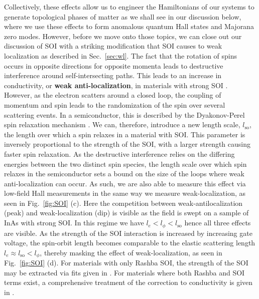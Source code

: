 Collectively, these effects allow us to engineer the Hamiltonians of our systems to generate topological phases of matter as we shall see in our discussion below,
where we use these effects to form anomalous quantum Hall states and Majorana zero modes. However, before we move onto those topics, we can close out our discussion of SOI
with a striking modification that SOI causes to weak localization as described in Sec.~\ref{sec:wl}. The fact that the rotation of spins occurs in opposite
directions for opposite momenta leads to destructive interference around self-intersecting paths. This leads to an increase in conductivity, or \textbf{weak anti-localization},
in materials with strong SOI \cite{10.1143/PTP.63.707}. However, as the electron scatters around a closed loop, the coupling of momentum and spin leads to the randomization of
the spin over several scattering events. In a semiconductor, this is described by the Dyakonov-Perel spin relaxation
mechanism \cite{DYAKONOV1971459}. We can, therefore, introduce a new length scale, $l_\textrm{so}$, the length over which a spin relaxes in a material with SOI.
This parameter is inversely proportional to the strength of the SOI, with a larger strength causing faster spin relaxation.
As the destructive interference relies on the differing energies between the two distinct spin species, the length scale over which spin relaxes in the semiconductor sets
a bound on the size of the loops where weak anti-localization can occur. As such, we are also able to measure
this effect via low-field Hall measurements in the same way we measure weak-localization, as seen in Fig.~\ref{fig:SOI} (c). Here the competition between
weak-antilocalization (peak) and weak-localization (dip) is visible as the field is swept on a sample of InAs with strong SOI. In this regime we have $l_e < l_\phi < l_\textrm{so}$
hence all three effects are visible. As the strength of the SOI interaction is increased by increasing gate voltage, the spin-orbit length becomes comparable to the elastic
scattering length $l_e \approx l_\textrm{so} < l_\phi$, thereby masking the effect of weak-localization, as seen in Fig.~\ref{fig:SOI} (d). For materials with only
Rashba SOI, the strength of the SOI may be extracted via fits given in \cite{10.1143/PTP.63.707}. For materials where both Rashba and SOI terms exist, a comprehensive
treatment of the correction to conductivity is given in \cite{PhysRevB.53.3912}.

